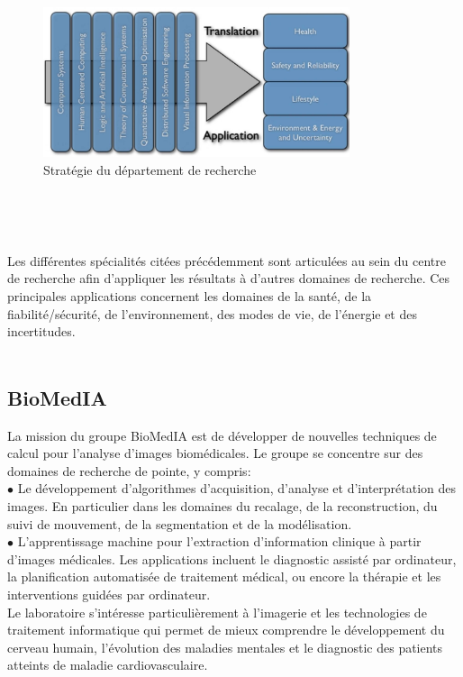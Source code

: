 \documentclass[10pt]{report}
\begin{document}
	\begin{figure}
		\includegraphics[width=9cm]{Reports/figures/research_strategy.jpg}
		\caption{Stratégie du département de recherche}
		\label{Stratégie du département de recherche}
	\end{figure}~\par~\par
	
	Les différentes spécialités citées précédemment sont articulées au sein du centre de recherche afin d'appliquer les résultats à d'autres domaines de recherche. Ces principales applications concernent les domaines de la santé, de la fiabilité/sécurité, de l'environnement, des modes de vie, de l'énergie et des incertitudes.
	\\
	\\
	\subsection{BioMedIA}

	La mission du groupe BioMedIA est de développer de nouvelles techniques de
	calcul pour l'analyse d'images biomédicales. Le groupe se concentre sur des
	domaines de recherche de pointe, y compris:\\
	{$\bullet$} Le développement d'algorithmes d'acquisition, d'analyse et d'interprétation des images. En particulier dans les domaines du recalage, de la reconstruction,
	du suivi de mouvement, de la segmentation et de la modélisation. \\
	{$\bullet$} L'apprentissage machine pour l'extraction d'information clinique à partir
	d'images médicales. Les applications incluent le diagnostic assisté par
	ordinateur, la planification automatisée de traitement médical, ou encore la thérapie et les interventions guidées par ordinateur. \\
	Le laboratoire s'intéresse particulièrement à l'imagerie et les technologies de
	traitement informatique qui permet de mieux comprendre le
	développement du cerveau humain, l’évolution des maladies mentales et le
	diagnostic des patients atteints de maladie cardiovasculaire.
	
\end{document}
